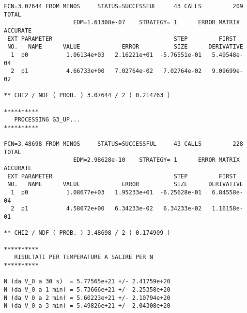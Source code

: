 {\begin{verbatim}
FCN=3.07644 FROM MINOS     STATUS=SUCCESSFUL     43 CALLS         209 TOTAL
                    EDM=1.61308e-07    STRATEGY= 1      ERROR MATRIX ACCURATE 
 EXT PARAMETER                                   STEP         FIRST   
 NO.   NAME      VALUE            ERROR          SIZE      DERIVATIVE 
  1  p0           1.06134e+03   2.16221e+01  -5.76551e-01   5.49548e-04
  2  p1           4.66733e+00   7.02764e-02   7.02764e-02   9.09699e-02

** CHI2 / NDF ( PROB. ) 3.07644 / 2 ( 0.214763 )

**********
   PROCESSING G3_UP...
**********

FCN=3.48698 FROM MINOS     STATUS=SUCCESSFUL     43 CALLS         228 TOTAL
                    EDM=2.98628e-10    STRATEGY= 1      ERROR MATRIX ACCURATE 
 EXT PARAMETER                                   STEP         FIRST   
 NO.   NAME      VALUE            ERROR          SIZE      DERIVATIVE 
  1  p0           1.08677e+03   1.95233e+01  -6.25628e-01   6.84558e-04
  2  p1           4.58072e+00   6.34233e-02   6.34233e-02   1.16158e-01

** CHI2 / NDF ( PROB. ) 3.48698 / 2 ( 0.174909 )

**********
   RISULTATI PER TEMPERATURE A SALIRE PER N
**********

N (da V_0 a 30 s)  = 5.77565e+21 +/- 2.41759e+20
N (da V_0 a 1 min) = 5.73666e+21 +/- 2.25358e+20
N (da V_0 a 2 min) = 5.60223e+21 +/- 2.10794e+20
N (da V_0 a 3 min) = 5.49826e+21 +/- 2.04308e+20
\end{verbatim}}